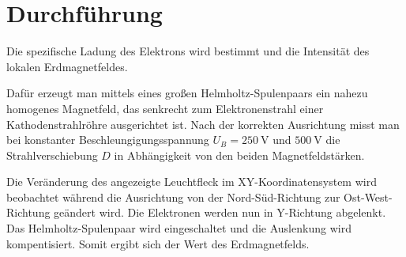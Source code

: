 \section{Durchführung}
\label{sec:Durchführung}


Die spezifische Ladung des Elektrons wird bestimmt und die Intensität des lokalen Erdmagnetfeldes. 

Dafür erzeugt man mittels eines großen Helmholtz-Spulenpaars ein nahezu homogenes Magnetfeld, das senkrecht zum Elektronenstrahl einer Kathodenstrahlröhre ausgerichtet ist. Nach der korrekten Ausrichtung misst man bei konstanter Beschleungigungsspannung $U_B = \SI{250}{\volt}$ und $\SI{500}{\volt}$ die Strahlverschiebung $D$ in Abhängigkeit von den beiden Magnetfeldstärken. 

Die Veränderung des angezeigte Leuchtfleck im XY-Koordinatensystem wird beobachtet während die Ausrichtung von der Nord-Süd-Richtung zur Ost-West-Richtung geändert wird. Die Elektronen werden nun in Y-Richtung abgelenkt. Das Helmholtz-Spulenpaar wird eingeschaltet und die Auslenkung wird kompentisiert. Somit ergibt sich der Wert des Erdmagnetfelds. 
